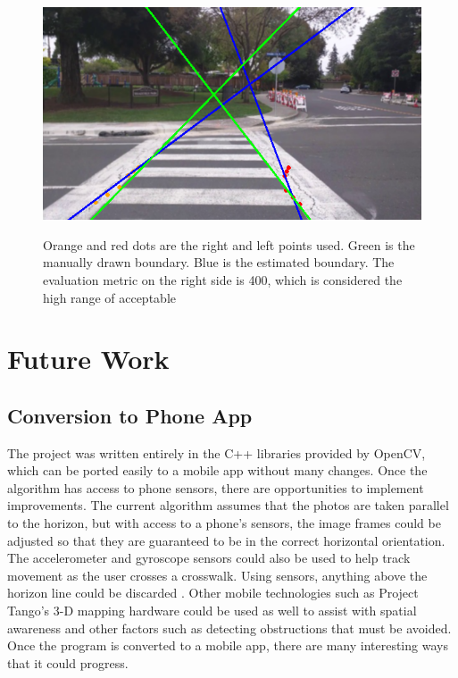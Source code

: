 \documentclass[12pt]{ucthesis}
\newcommand{\captionfonts}{\small\bf\ssp}
\begin{document}
\begin{figure}[t]
\begin{center}
\includegraphics[width=12cm]{400RightSide.png}
\captionfonts
\caption[Upper Limit of Boundary Line Metric]{Orange and red dots are the right and left points used. Green is the manually drawn boundary. Blue is the estimated boundary. The evaluation metric on the right side is 400, which is considered the high range of acceptable}
\label{fig:400Metric}
\end{center}
\end{figure}


\chapter{Future Work}
\label{future work}

\section{Conversion to Phone App}

The project was written entirely in the C++ libraries provided by OpenCV, which can be ported easily to a mobile app without many changes. Once the algorithm has access to phone sensors, there are opportunities to implement improvements. The current algorithm assumes that the photos are taken parallel to the horizon, but with access to a phone's sensors, the image frames could be adjusted so that they are guaranteed to be in the correct horizontal orientation. The accelerometer and gyroscope sensors could also be used to help track movement as the user crosses a crosswalk. Using sensors, anything above the horizon line could be discarded \cite{Crosswatch2Lane}. Other mobile technologies such as Project Tango's 3-D mapping hardware \cite{projectTango} could be used as well to assist with spatial awareness and other factors such as detecting obstructions that must be avoided. Once the program is converted to a mobile app, there are many interesting ways that it could progress.
\end{document}
